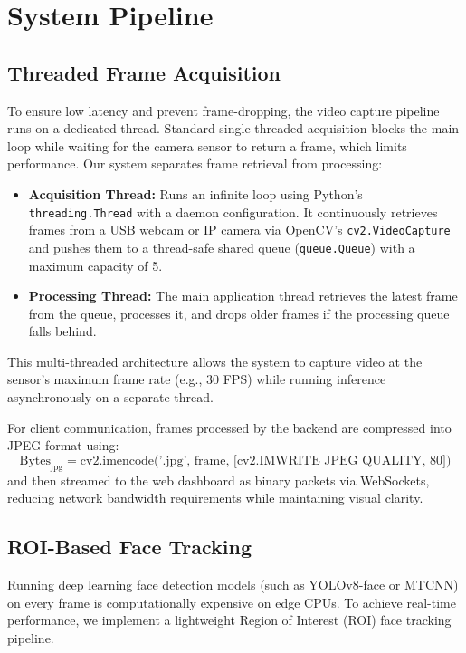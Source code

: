\chapter{System Pipeline}

\section{Threaded Frame Acquisition}
To ensure low latency and prevent frame-dropping, the video capture pipeline runs on a dedicated thread. Standard single-threaded acquisition blocks the main loop while waiting for the camera sensor to return a frame, which limits performance. Our system separates frame retrieval from processing:
\begin{itemize}
    \item \textbf{Acquisition Thread:} Runs an infinite loop using Python's \texttt{threading.Thread} with a daemon configuration. It continuously retrieves frames from a USB webcam or IP camera via OpenCV's \texttt{cv2.VideoCapture} and pushes them to a thread-safe shared queue (\texttt{queue.Queue}) with a maximum capacity of 5.
    \item \textbf{Processing Thread:} The main application thread retrieves the latest frame from the queue, processes it, and drops older frames if the processing queue falls behind.
\end{itemize}
This multi-threaded architecture allows the system to capture video at the sensor's maximum frame rate (e.g., 30 FPS) while running inference asynchronously on a separate thread.

For client communication, frames processed by the backend are compressed into JPEG format using:
\begin{equation}
    \text{Bytes}_{\text{jpg}} = \text{cv2.imencode('.jpg', frame, [cv2.IMWRITE\_JPEG\_QUALITY, 80])}
\end{equation}
and then streamed to the web dashboard as binary packets via WebSockets, reducing network bandwidth requirements while maintaining visual clarity.

\section{ROI-Based Face Tracking}
Running deep learning face detection models (such as YOLOv8-face or MTCNN) on every frame is computationally expensive on edge CPUs. To achieve real-time performance, we implement a lightweight Region of Interest (ROI) face tracking pipeline.

